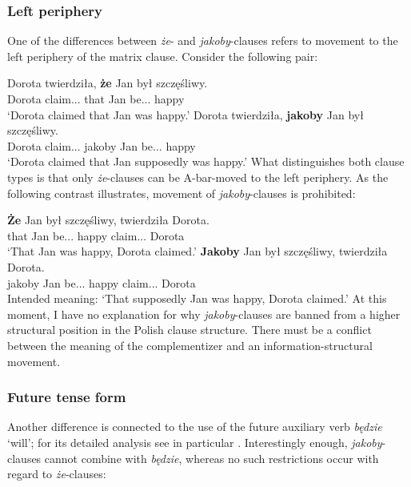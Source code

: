 \documentclass[output=paper
,modfonts
,nonflat]{langsci/langscibook}
\begin{document}
\subsubsection{Left periphery}
One of the differences between \emph{że}- and \emph{jakoby}-clauses refers to movement to the left periphery of the matrix clause. Consider the following pair:

\ea \ea \gll	Dorota twierdziła, \textbf{że} Jan był szczęśliwy. \\
		Dorota claim.{\lptcp}.{\sg}.{\fem} that Jan be.{\lptcp}.{\sg}.{\masc} happy \\
		\glt`Dorota claimed that Jan was happy.'
		\ex\gll		Dorota twierdziła, \textbf{jakoby} Jan był szczęśliwy. \\
			Dorota claim.{\lptcp}.{\sg}.{\fem} jakoby Jan be.{\lptcp}.{\sg}.{\masc} happy \\
		\glt`Dorota claimed that Jan supposedly was happy.'
\z\z
What distinguishes both clause types is that only \emph{że}-clauses can be A-bar-moved to the left periphery. As the following contrast illustrates, movement of \emph{jakoby}-clauses is prohibited:

\ea \ea \gll	\textbf{Że} Jan był szczęśliwy, twierdziła Dorota. \\
		 that Jan be.{\lptcp}.{\sg}.{\masc} happy  claim.{\lptcp}.{\sg}.{\fem} Dorota \\
    \glt`That Jan was happy, Dorota claimed.'
	\ex\gll		*\textbf{Jakoby} Jan był szczęśliwy, twierdziła Dorota. \\
		 jakoby Jan be.{\lptcp}.{\sg}.{\masc} happy  claim.{\lptcp}.{\sg}.{\fem} Dorota \\
	\glt Intended meaning: `That supposedly Jan was happy, Dorota claimed.'
    \z\z
At this moment, I have no explanation for why \emph{jakoby}-clauses are banned from a higher structural position in the Polish clause structure. There must be a conflict between the meaning of the complementizer and an information-structural movement.

\subsubsection{Future tense form}
Another difference is connected to the use of the future auxiliary verb \emph{będzie} `will'; for its detailed analysis see in particular \textcite{Baszczak-Jabonskaetal2014}. Interestingly enough, \emph{jakoby}-clauses cannot combine with \emph{będzie}, whereas no such restrictions occur with regard to \emph{że}-clauses:
\end{document}
